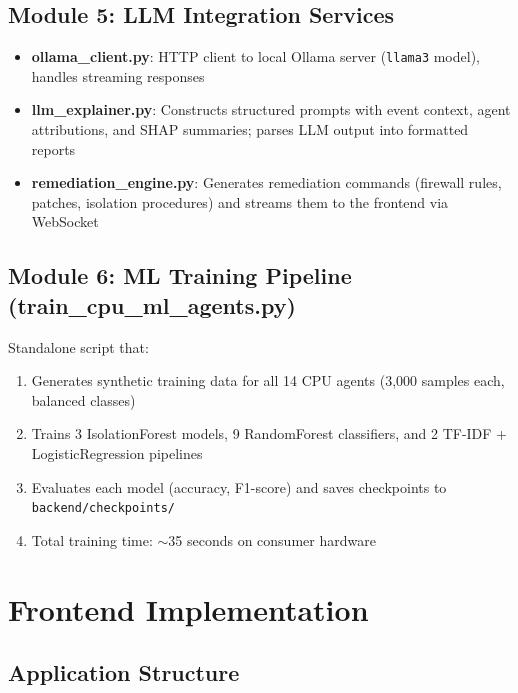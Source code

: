 \documentclass[12pt, a4paper]{report}
\begin{document}
\subsection{Module 5: LLM Integration Services}

\begin{itemize}
    \item \textbf{ollama\_client.py}: HTTP client to local Ollama server (\texttt{llama3} model), handles streaming responses
    \item \textbf{llm\_explainer.py}: Constructs structured prompts with event context, agent attributions, and SHAP summaries; parses LLM output into formatted reports
    \item \textbf{remediation\_engine.py}: Generates remediation commands (firewall rules, patches, isolation procedures) and streams them to the frontend via WebSocket
\end{itemize}

\subsection{Module 6: ML Training Pipeline (train\_cpu\_ml\_agents.py)}

Standalone script that:
\begin{enumerate}
    \item Generates synthetic training data for all 14 CPU agents (3,000 samples each, balanced classes)
    \item Trains 3 IsolationForest models, 9 RandomForest classifiers, and 2 TF-IDF + LogisticRegression pipelines
    \item Evaluates each model (accuracy, F1-score) and saves checkpoints to \texttt{backend/checkpoints/}
    \item Total training time: $\sim$35 seconds on consumer hardware
\end{enumerate}

\section{Frontend Implementation}

\subsection{Application Structure}
\end{document}
